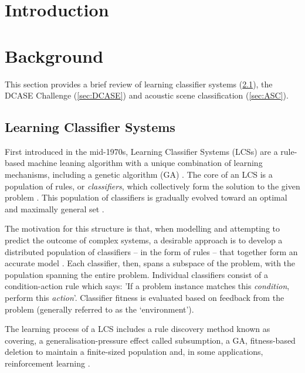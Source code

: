 \documentclass[11pt]{article}
\begin{document}
\begin{multicols}{2}


\section{Introduction}






\section{Background}

This section provides a brief review of learning classifier systems (\ref{sec:LCS}), the DCASE Challenge (\ref{sec:DCASE}) and acoustic scene classification (\ref{sec:ASC}).



\subsection{Learning Classifier Systems}
\label{sec:LCS}

First introduced in the mid-1970s, Learning Classifier Systems (LCSs) are a rule-based machine leaning algorithm with a unique combination of learning mechanisms, including a genetic algorithm (GA) \cite{Butz2015}. The core of an LCS is a population of rules, or \textit{classifiers}, which collectively form the solution to the given problem \cite{Urbanowicz2009}. This population of classifiers is gradually evolved toward an optimal and maximally general set \cite{Urbanowicz2009}.

The motivation for this structure is that, when modelling and attempting to predict the outcome of complex systems, a desirable approach is to develop a distributed population of classifiers -- in the form of rules -- that together form an accurate model \cite[p.~2]{Urbanowicz2009}. Each classifier, then, spans a subspace of the problem, with the population spanning the entire problem. Individual classifiers consist of a condition-action rule which says: 'If a problem instance matches this \textit{condition}, perform this \textit{action}'. Classifier fitness is evaluated based on feedback from the problem (generally referred to as the `environment').

The learning process of a LCS includes a rule discovery method known as covering, a generalisation-pressure effect called subsumption, a GA, fitness-based deletion to maintain a finite-sized population and, in some applications, reinforcement learning \cite{Butz2000}.


\end{multicols}
\end{document}
